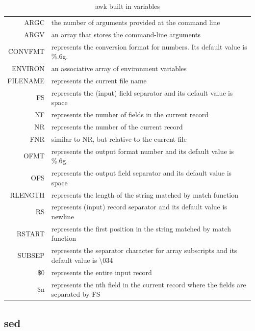 \begin{center}
	\begin{table}[h]
		\begin{tabular}{ r | l }
		 ARGC & the number of arguments provided at the command line \\
		 ARGV & an array that stores the command-line arguments \\
		 CONVFMT & represents the conversion format for numbers. Its default value is \%.6g. \\
		 ENVIRON & an associative array of environment variables \\
		 FILENAME & represents the current file name \\
		 FS & represents the (input) field separator and its default value is space \\
		 NF & represents the number of fields in the current record \\
		 NR & represents the number of the current record \\
		 FNR &  similar to NR, but relative to the current file \\
		 OFMT & represents the output format number and its default value is \%.6g.\\
		 OFS & represents the output field separator and its default value is space\\
		 RLENGTH & represents the length of the string matched by match function\\
		 RS & represents (input) record separator and its default value is newline \\
		 RSTART & represents the first position in the string matched by match function \\
		 SUBSEP & represents the separator character for array subscripts and its default value is \textbackslash 034\\
		 \$0 & represents the entire input record \\	
		 \$n & represents the nth field in the current record where the fields are separated by FS\\		
		 
		\end{tabular}  
		\caption{awk built in variables} 
		\label{tab:awk_b_v}          
	\end{table}
\end{center}
 
 
 
\subsection{sed}

